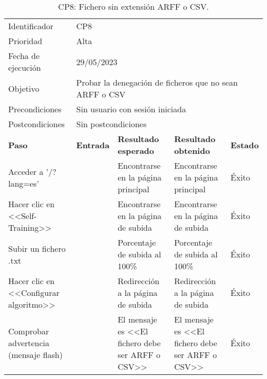 \begin{table}[H]
\begin{tabular}{p{}p{}p{}p{}p{}}
\rowcolor{gray!25}
Identificador   & \multicolumn{4}{l}{CP8}                                                   \\
Prioridad   & \multicolumn{4}{l}{Alta}                                                    \\
\rowcolor{gray!25}
Fecha de ejecución   & \multicolumn{4}{l}{29/05/2023}                                                    \\
Objetivo        & \multicolumn{4}{p{0.80\textwidth}}{Probar la denegación de ficheros que no sean ARFF o CSV}                                                     \\
\rowcolor{gray!25}
Precondiciones  & \multicolumn{4}{l}{Sin usuario con sesión iniciada}                                                     \\
Postcondiciones & \multicolumn{4}{l}{Sin postcondiciones}                                                     \\ \hline
\rowcolor{gray!25}
\textbf{Paso}   & \textbf{Entrada} & \textbf{Resultado esperado} & \textbf{Resultado obtenido} & \textbf{Estado} \\ \hline
Acceder a '/?lang=es'                                 &                        & Encontrarse en la página principal                                   & Encontrarse en la página principal                                   & Éxito  \\ \hline
Hacer clic en <<Self-Training>>                       &                        & Encontrarse en la página de subida                                   & Encontrarse en la página de subida                                & Éxito                            \\ \hline
Subir un fichero .txt                                 &                        & Porcentaje de subida al 100\%                                        & Porcentaje de subida al 100\%                                & Éxito                            \\ \hline
Hacer clic en <<Configurar algoritmo>>                &                        & Redirección a la página de subida                                    & Redirección a la página de subida                                 & Éxito                            \\ \hline
Comprobar advertencia (mensaje flash)                 &                        & El mensaje es <<El fichero debe ser ARFF o CSV>>                     & El mensaje es <<El fichero debe ser ARFF o CSV>>                                 & Éxito  \\ \hline 
\end{tabular}
\caption{CP8: Fichero sin extensión ARFF o CSV.}
\end{table}

